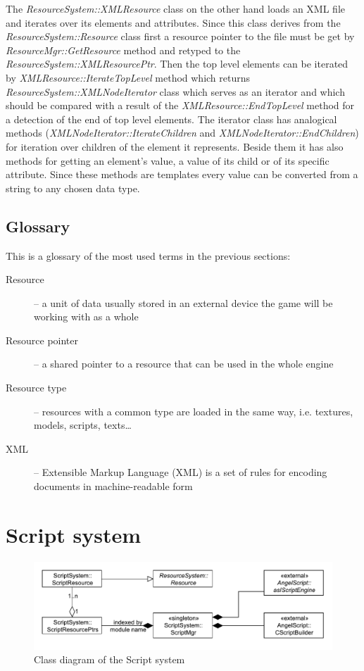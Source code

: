 \documentclass[a4paper, 12pt]{report}
\begin{document}
The \emph{ResourceSystem::XMLResource} class on the other hand loads an XML file and iterates over its elements and attributes. Since this class derives from the \emph{ResourceSystem::Resource} class first a resource pointer to the file must be get by \emph{ResourceMgr::GetResource} method and retyped to the \emph{ResourceSystem::XMLResourcePtr}. Then the top level elements can be iterated by \emph{XMLResource::IterateTopLevel} method which returns \emph{ResourceSystem::XMLNodeIterator} class which serves as an iterator and which should be compared with a result of the \emph{XMLResource::EndTopLevel} method for a detection of the end of top level elements. The iterator class has analogical methods (\emph{XMLNodeIterator::IterateChildren} and \emph{XMLNodeIterator::EndChildren}) for iteration over children of the element it represents. Beside them it has also methods for getting an element's value, a value of its child or of its specific attribute. Since these methods are templates every value can be converted from a string to any chosen data type.

\section{Glossary}
This is a glossary of the most used terms in the previous sections:

\begin{description}
  \item[Resource] -- a unit of data usually stored in an external device the game will be working with as a whole
  \item[Resource pointer] -- a shared pointer to a resource that can be used in the whole engine
  \item[Resource type] -- resources with a common type are loaded in the same way, i.e. textures, models, scripts, texts\ldots
  \item[XML] -- Extensible Markup Language (XML) is a set of rules for encoding documents in machine-readable form
\end{description}


\chapter{Script system}

\begin{figure}[htbp]
	\centering
		\includegraphics[width=1\textwidth]{ScriptSystemClassDiagram.pdf}
	\caption{Class diagram of the Script system}
	\label{fig:scriptsystem-diagram}
\end{figure}
\end{document}
